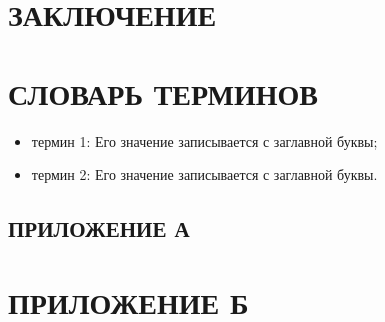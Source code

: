 \documentclass[a4paper,14pt]{extarticle}
\begin{document}
\section*{ЗАКЛЮЧЕНИЕ}
\newpage

\renewcommand{\refname}{СПИСОК ИСПОЛЬЗОВАННЫХ ИСТОЧНИКОВ}


\newpage

\section*{СЛОВАРЬ ТЕРМИНОВ}

\begin{itemize}
  \item термин 1: Его значение записывается с заглавной буквы;
  \item термин 2: Его значение записывается с заглавной буквы.
\end{itemize}

\newpage

\begin{landscape}
\section*{ПРИЛОЖЕНИЕ А}
\label{appa}

% 
\end{landscape}

\section*{ПРИЛОЖЕНИЕ Б}
\label{appb}


\newpage
\end{document}

